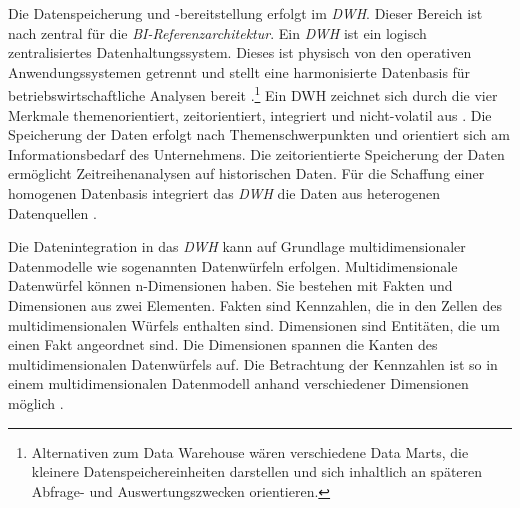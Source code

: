 Die Datenspeicherung und -bereitstellung erfolgt im \textit{\acrshort{DWH}}. Dieser Bereich ist nach \citeauthor{linden_geschaftsmodellbasierte_2016} zentral für die 
\textit{\acrshort{BI}-Referenzarchitektur}\cite[vgl.][135]{linden_geschaftsmodellbasierte_2016}. Ein \textit{\acrlong{DWH}} ist ein logisch zentralisiertes Datenhaltungssystem. Dieses ist physisch 
von den operativen Anwendungssystemen getrennt und stellt eine harmonisierte Datenbasis für betriebswirtschaftliche Analysen bereit \cite[vgl.][135]{mucksch_data_2000}.\footnote{Alternativen zum Data Warehouse wären verschiedene Data Marts, 
die kleinere Datenspeichereinheiten darstellen und sich inhaltlich an späteren Abfrage- und Auswertungszwecken orientieren.} 
Ein \acrlong{DWH} zeichnet sich durch die vier Merkmale themenorientiert, zeitorientiert, integriert und nicht-volatil aus \cites[vgl.][29 f.]{inmon_building_nodate_2005}[vgl.][271 f.]{abts_grundkurs_2017}[vgl.][136 f. ]{linden_geschaftsmodellbasierte_2016}. Die Speicherung der Daten erfolgt nach Themenschwerpunkten und
orientiert sich am Informationsbedarf des Unternehmens. Die zeitorientierte Speicherung der Daten ermöglicht Zeitreihenanalysen auf historischen Daten. 
Für die Schaffung einer homogenen Datenbasis integriert das \textit{\acrshort{DWH}} die Daten aus heterogenen Datenquellen \cite[vgl.][136]{linden_geschaftsmodellbasierte_2016}.

Die Datenintegration in das \textit{\acrlong{DWH}} kann auf Grundlage  multidimensionaler Datenmodelle wie sogenannten Datenwürfeln erfolgen. 
Multidimensionale Datenwürfel können n-Dimensionen haben. Sie bestehen mit Fakten und Dimensionen aus zwei Elementen. 
Fakten sind Kennzahlen, die in den Zellen des multidimensionalen Würfels enthalten sind.
Dimensionen sind Entitäten, die um einen Fakt angeordnet sind. Die Dimensionen spannen die Kanten des multidimensionalen Datenwürfels auf.
Die Betrachtung der Kennzahlen ist so in einem multidimensionalen Datenmodell anhand verschiedener Dimensionen möglich 
\cites[vgl.][13 ff., 21 f.]{farkisch_data-warehouse-systeme_2011}[vgl.][66 f.]{kemper_business_2010}.

